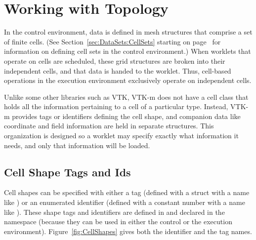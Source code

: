 

\section{Working with Topology}
\label{sec:ExecutionEnvironment:WorkingWithTopology}

In the control environment, data is defined in mesh structures that
comprise a set of finite cells. (See Section~\ref{sec:DataSets:CellSets}
starting on page~\pageref{sec:DataSets:CellSets} for information on
defining cell sets in the control environment.) When worklets that operate
on cells are scheduled, these grid structures are broken into their
independent cells, and that data is handed to the worklet. Thus, cell-based
operations in the execution environment exclusively operate on independent
cells.

Unlike some other libraries such as VTK, VTK-m does not have a cell class
that holds all the information pertaining to a cell of a particular type.
Instead, VTK-m provides tags or identifiers defining the cell shape, and
companion data like coordinate and field information are held in separate
structures. This organization is designed so a worklet may specify exactly
what information it needs, and only that information will be loaded.

\subsection{Cell Shape Tags and Ids}
\label{sec:CellShapeTagsIds}


Cell shapes can be specified with either a tag (defined with a struct with
a name like ) or an enumerated identifier
(defined with a constant number with a name like
). These shape tags and identifiers are
defined in  and declared in the \vtkm{}
namespace (because they can be used in either the control or the execution
environment). Figure~\ref{fig:CellShapes} gives both the identifier and the
tag names.

